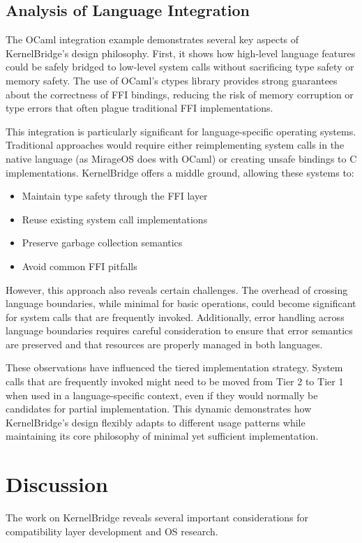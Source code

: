 \documentclass[conference]{IEEEtran}
\begin{document}
\subsection{Analysis of Language Integration}
The OCaml integration example demonstrates several key aspects of KernelBridge's design philosophy.
First, it shows how high-level language features could be safely bridged to low-level system calls without sacrificing type safety or memory safety. The use of OCaml's ctypes library provides strong guarantees about the correctness of FFI bindings, reducing the risk of memory corruption or type errors that often plague traditional FFI implementations.

This integration is particularly significant for language-specific operating systems. Traditional approaches would require either reimplementing system calls in the native language (as MirageOS does with OCaml) or creating unsafe bindings to C implementations. KernelBridge offers a middle ground, allowing these systems to:
\begin{itemize}
	\item Maintain type safety through the FFI layer
	\item Reuse existing system call implementations
	\item Preserve garbage collection semantics
	\item Avoid common FFI pitfalls
\end{itemize}

However, this approach also reveals certain challenges. The overhead of crossing language boundaries, while minimal for basic operations, could become significant for system calls that are frequently invoked. Additionally, error handling across language boundaries requires careful consideration to ensure that error semantics are preserved and that resources are properly managed in both languages.

These observations have influenced the tiered implementation strategy. System calls that are frequently invoked might need to be moved from Tier 2 to Tier 1 when used in a language-specific context, even if they would normally be candidates for partial implementation. This dynamic demonstrates how KernelBridge's design flexibly adapts to different usage patterns while maintaining its core philosophy of minimal yet sufficient implementation.

\section{Discussion}
The work on KernelBridge reveals several important considerations for compatibility layer development and OS research.
\end{document}
